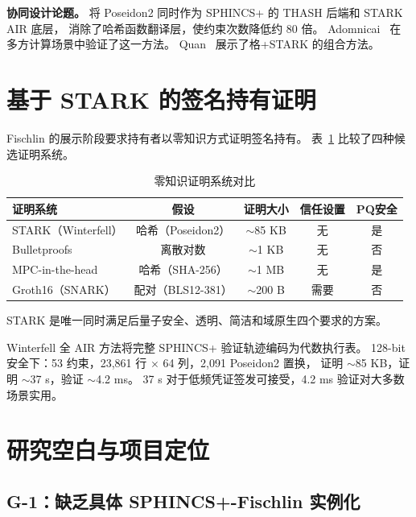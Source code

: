 \documentclass[11pt,a4paper]{ctexart}
\begin{document}
\noindent\textbf{协同设计论题。}
将 Poseidon2 同时作为 SPHINCS+ 的 THASH 后端和 STARK AIR 底层，
消除了哈希函数翻译层，使约束次数降低约 80 倍。
Adomnicai~\cite{Adomnicai2026} 在多方计算场景中验证了这一方法。
Quan~\cite{Quan2022} 展示了格+STARK 的组合方法。

\section{基于 STARK 的签名持有证明}

Fischlin 的展示阶段要求持有者以零知识方式证明签名持有。
表~\ref{tab:proof} 比较了四种候选证明系统。

\begin{table}[h]
\centering
\caption{零知识证明系统对比}
\label{tab:proof}
\small
\begin{tabular}{@{}lcccc@{}}
\toprule
\textbf{证明系统} & \textbf{假设} & \textbf{证明大小} & \textbf{信任设置} & \textbf{PQ安全} \\
\midrule
STARK（Winterfell） & 哈希（Poseidon2） & $\sim$85 KB & 无 & 是 \\
Bulletproofs~\cite{Bunz2018Bulletproofs} & 离散对数 & $\sim$1 KB & 无 & 否 \\
MPC-in-the-head~\cite{Katz2018ImprovedNIZK} & 哈希（SHA-256） & $\sim$1 MB & 无 & 是 \\
Groth16（SNARK） & 配对（BLS12-381） & $\sim$200 B & 需要 & 否 \\
\bottomrule
\end{tabular}
\end{table}

STARK 是唯一同时满足后量子安全、透明、简洁和域原生四个要求的方案。

Winterfell 全 AIR 方法将完整 SPHINCS+ 验证轨迹编码为代数执行表。
128-bit 安全下：53 约束，23,861 行 $\times$ 64 列，2,091 Poseidon2 置换，
证明 $\sim$85 KB，证明 $\sim$37 s，验证 $\sim$4.2 ms。
37 s 对于低频凭证签发可接受，4.2 ms 验证对大多数场景实用。

\section{研究空白与项目定位}

\subsection{G-1：缺乏具体 SPHINCS+-Fischlin 实例化}
\end{document}
